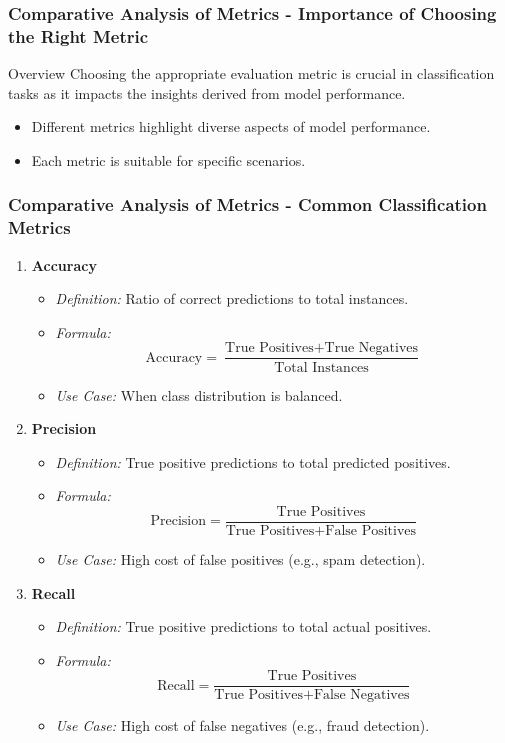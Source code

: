 \documentclass[aspectratio=169]{beamer}
\begin{document}
\begin{frame}[fragile]
    \frametitle{Comparative Analysis of Metrics - Importance of Choosing the Right Metric}
    \begin{block}{Overview}
        Choosing the appropriate evaluation metric is crucial in classification tasks as it impacts the insights derived from model performance.
    \end{block}
    \begin{itemize}
        \item Different metrics highlight diverse aspects of model performance.
        \item Each metric is suitable for specific scenarios.
    \end{itemize}
\end{frame}

\begin{frame}[fragile]
    \frametitle{Comparative Analysis of Metrics - Common Classification Metrics}
    \begin{enumerate}
        \item \textbf{Accuracy}
        \begin{itemize}
            \item \textit{Definition:} Ratio of correct predictions to total instances.
            \item \textit{Formula:}  
            \[
            \text{Accuracy} = \frac{\text{True Positives} + \text{True Negatives}}{\text{Total Instances}}
            \]
            \item \textit{Use Case:} When class distribution is balanced.
        \end{itemize}
        
        \item \textbf{Precision}
        \begin{itemize}
            \item \textit{Definition:} True positive predictions to total predicted positives.
            \item \textit{Formula:}  
            \[
            \text{Precision} = \frac{\text{True Positives}}{\text{True Positives} + \text{False Positives}}
            \]
            \item \textit{Use Case:} High cost of false positives (e.g., spam detection).
        \end{itemize}
        
        \item \textbf{Recall}
        \begin{itemize}
            \item \textit{Definition:} True positive predictions to total actual positives.
            \item \textit{Formula:}  
            \[
            \text{Recall} = \frac{\text{True Positives}}{\text{True Positives} + \text{False Negatives}}
            \]
            \item \textit{Use Case:} High cost of false negatives (e.g., fraud detection).
        \end{itemize}
    \end{enumerate}
\end{frame}
\end{document}
